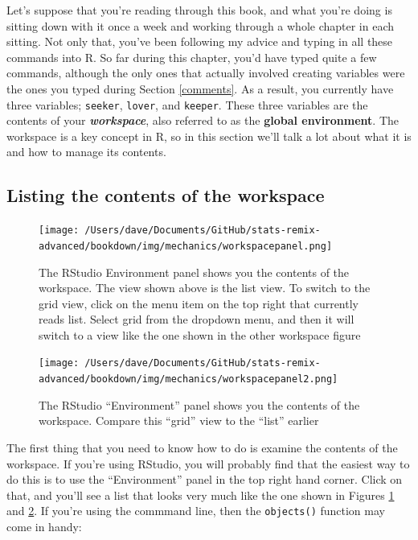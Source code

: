 \documentclass[
]{book}
\begin{document}
Let's suppose that you're reading through this book, and what you're doing is sitting down with it once a week and working through a whole chapter in each sitting. Not only that, you've been following my advice and typing in all these commands into R. So far during this chapter, you'd have typed quite a few commands, although the only ones that actually involved creating variables were the ones you typed during Section \ref{comments}. As a result, you currently have three variables; \texttt{seeker}, \texttt{lover}, and \texttt{keeper}. These three variables are the contents of your \textbf{\emph{workspace}}, also referred to as the \textbf{global environment}. The workspace is a key concept in R, so in this section we'll talk a lot about what it is and how to manage its contents.

\hypertarget{listing-the-contents-of-the-workspace}{%
\subsection{Listing the contents of the workspace}\label{listing-the-contents-of-the-workspace}}

\begin{figure}
\centering
\texttt{[image: /Users/dave/Documents/GitHub/stats-remix-advanced/bookdown/img/mechanics/workspacepanel.png]}
\caption{\label{fig:workspace}The RStudio Environment panel shows you the contents of the workspace. The view shown above is the list view. To switch to the grid view, click on the menu item on the top right that currently reads list. Select grid from the dropdown menu, and then it will switch to a view like the one shown in the other workspace figure}
\end{figure}

\begin{figure}
\centering
\texttt{[image: /Users/dave/Documents/GitHub/stats-remix-advanced/bookdown/img/mechanics/workspacepanel2.png]}
\caption{\label{fig:workspace2}The RStudio ``Environment'' panel shows you the contents of the workspace. Compare this ``grid'' view to the ``list'' earlier}
\end{figure}

The first thing that you need to know how to do is examine the contents of the workspace. If you're using RStudio, you will probably find that the easiest way to do this is to use the ``Environment'' panel in the top right hand corner. Click on that, and you'll see a list that looks very much like the one shown in Figures \ref{fig:workspace} and \ref{fig:workspace2}. If you're using the commmand line, then the \texttt{objects()} function may come in handy:
\end{document}
